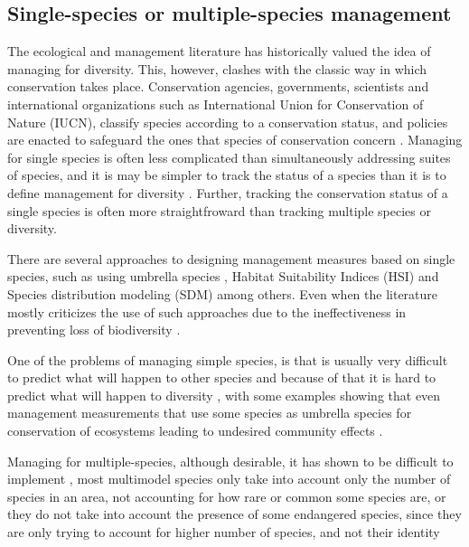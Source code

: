 \documentclass[article]{jss}
\begin{document}
\subsection{Single-species or multiple-species
management}\label{single-species-or-multiple-species-management}

The ecological and management literature has historically valued the
idea of managing for diversity. This, however, clashes with the classic
way in which conservation takes place. Conservation agencies,
governments, scientists and international organizations such as
International Union for Conservation of Nature (IUCN), classify species
according to a conservation status, and policies are enacted to
safeguard the ones that species of conservation concern
\citep{keller2004red, rodrigues2006value}. Managing for single species
is often less complicated than simultaneously addressing suites of
species, and it is may be simpler to track the status of a species than
it is to define management for diversity
\citep{simberloff1998flagships}. Further, tracking the conservation
status of a single species is often more straightfroward than tracking
multiple species or diversity.

There are several approaches to designing management measures based on
single species, such as using umbrella species
\citep{crosby2015looking, bichet2016maintaining}, Habitat Suitability
Indices (HSI)
\citep{reza2013integrating, soniat2013predicting, zohmann2013modelling}
and Species distribution modeling (SDM)
\citep{peterson2011ecological, guisan2013predicting} among others. Even
when the literature mostly criticizes the use of such approaches due to
the ineffectiveness in preventing loss of biodiversity
\citep{roberge2004usefulness, branton2011assessing}.

One of the problems of managing simple species, is that is usually very
difficult to predict what will happen to other species and because of
that it is hard to predict what will happen to diversity
\citep{pulliam2000relationship}, with some examples showing that even
management measurements that use some species as umbrella species for
conservation of ecosystems leading to undesired community effects
\citep{white2013conservation}.

Managing for multiple-species, although desirable, it has shown to be
difficult to implement
\citep{mollmann2014implementing, lmgren2015baltic}, most multimodel
species only take into account only the number of species in an area,
not accounting for how rare or common some species are, or they do not
take into account the presence of some endangered species, since they
are only trying to account for higher number of species, and not their
identity
\citep{taft2002waterbird, tori2002wetland, plaganyi2014multispecies}
\end{document}
